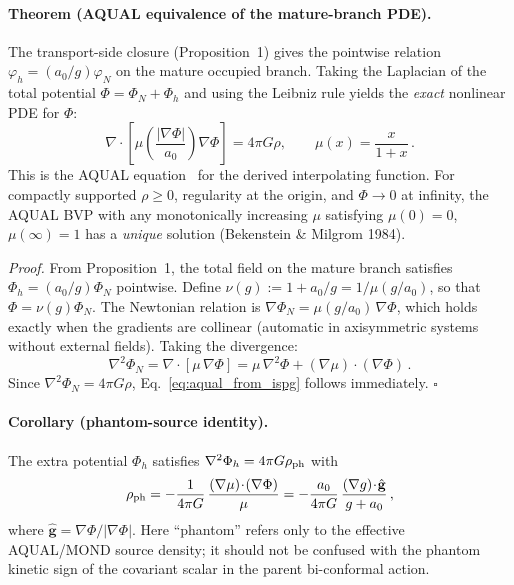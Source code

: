 \documentclass[11pt]{article}
\begin{document}
\paragraph{Theorem (AQUAL equivalence of the mature-branch PDE).}
The transport-side closure (Proposition~1) gives the pointwise relation
$\varphi_h=(a_0/g)\varphi_N$ on the mature occupied branch.  Taking the
Laplacian of the total potential $\Phi=\Phi_N+\Phi_h$ and using the
Leibniz rule yields the \emph{exact} nonlinear PDE for $\Phi$:
\begin{equation}\label{eq:aqual_from_ispg}
  \nabla\!\cdot\!\left[
    \mu\!\left(\frac{|\nabla\Phi|}{a_0}\right)\nabla\Phi
  \right]
  = 4\pi G\rho,
  \qquad
  \mu(x)=\frac{x}{1+x}\,.
\end{equation}
This is the AQUAL equation~\cite{BekensteinMilgrom1984} for the
derived interpolating function.  For compactly supported $\rho\ge0$,
regularity at the origin, and $\Phi\to0$ at infinity, the AQUAL BVP
with any monotonically increasing $\mu$ satisfying $\mu(0)=0$,
$\mu(\infty)=1$ has a \emph{unique} solution (Bekenstein \& Milgrom
1984).

\textit{Proof.}
From Proposition~1, the total field on the mature branch satisfies
$\Phi_h=(a_0/g)\Phi_N$ pointwise.  Define
$\nu(g):=1+a_0/g=1/\mu(g/a_0)$, so that $\Phi=\nu(g)\Phi_N$.  The
Newtonian relation is
$\nabla\Phi_N=\mu(g/a_0)\,\nabla\Phi$, which holds exactly when the
gradients are collinear (automatic in axisymmetric systems without
external fields).  Taking the divergence:
\begin{equation}\label{eq:aqual_divergence}
  \nabla^2\Phi_N
  = \nabla\!\cdot\![\mu\,\nabla\Phi]
  = \mu\,\nabla^2\Phi
    + (\nabla\mu)\!\cdot\!(\nabla\Phi)\,.
\end{equation}
Since $\nabla^2\Phi_N=4\pi G\rho$,
Eq.~\eqref{eq:aqual_from_ispg} follows immediately.
\hfill$\square$

\paragraph{Corollary (phantom-source identity).}
The extra potential $\Phi_h$ satisfies $\nabla^2\Phi_h=4\pi G\rho_{\rm ph}$
with
\begin{equation}\label{eq:phantom_density}
  \rho_{\rm ph}
  = -\frac{1}{4\pi G}\,
    \frac{(\nabla\mu)\!\cdot\!(\nabla\Phi)}{\mu}
  = -\frac{a_0}{4\pi G}\,
    \frac{(\nabla g)\!\cdot\!\hat{\mathbf{g}}}{g+a_0}\,,
\end{equation}
where $\hat{\mathbf{g}}=\nabla\Phi/|\nabla\Phi|$.
Here ``phantom'' refers only to the effective AQUAL/MOND source
density; it should not be confused with the phantom kinetic sign
of the covariant scalar in the parent bi-conformal action.
\end{document}
